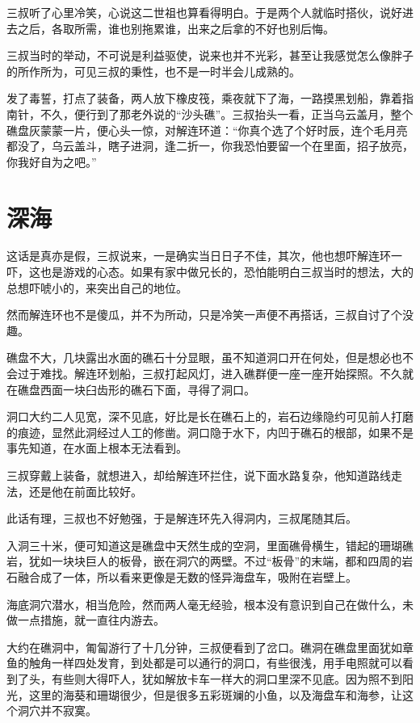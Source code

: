 三叔听了心里冷笑，心说这二世祖也算看得明白。于是两个人就临时搭伙，说好进去之后，各取所需，谁也别拖累谁，出来之后拿的不好也别后悔。

三叔当时的举动，不可说是利益驱使，说来也并不光彩，甚至让我感觉怎么像胖子的所作所为，可见三叔的秉性，也不是一时半会儿成熟的。

发了毒誓，打点了装备，两人放下橡皮筏，乘夜就下了海，一路摸黑划船，靠着指南针，不久，便行到了那老外说的“沙头礁”。三叔抬头一看，正当乌云盖月，整个礁盘灰蒙蒙一片，便心头一惊，对解连环道：“你真个选了个好时辰，连个毛月亮都没了，乌云盖斗，瞎子进洞，逢二折一，你我恐怕要留一个在里面，招子放亮，你我好自为之吧。”

\chapter{深海}

这话是真亦是假，三叔说来，一是确实当日日子不佳，其次，他也想吓解连环一吓，这也是游戏的心态。如果有家中做兄长的，恐怕能明白三叔当时的想法，大的总想吓唬小的，来突出自己的地位。

然而解连环也不是傻瓜，并不为所动，只是冷笑一声便不再搭话，三叔自讨了个没趣。

礁盘不大，几块露出水面的礁石十分显眼，虽不知道洞口开在何处，但是想必也不会过于难找。解连环划船，三叔打起风灯，进入礁群便一座一座开始探照。不久就在礁盘西面一块臼齿形的礁石下面，寻得了洞口。

洞口大约二人见宽，深不见底，好比是长在礁石上的，岩石边缘隐约可见前人打磨的痕迹，显然此洞经过人工的修凿。洞口隐于水下，内凹于礁石的根部，如果不是事先知道，在水面上根本无法看到。

三叔穿戴上装备，就想进入，却给解连环拦住，说下面水路复杂，他知道路线走法，还是他在前面比较好。

此话有理，三叔也不好勉强，于是解连环先入得洞内，三叔尾随其后。

入洞三十米，便可知道这是礁盘中天然生成的空洞，里面礁骨横生，错起的珊瑚礁岩，犹如一块块巨人的板骨，嵌在洞穴的两壁。不过“板骨”的末端，都和四周的岩石融合成了一体，所以看来更像是无数的怪异海盘车，吸附在岩壁上。

海底洞穴潜水，相当危险，然而两人毫无经验，根本没有意识到自己在做什么，未做一点措施，就一直往内游去。

大约在礁洞中，匍匐游行了十几分钟，三叔便看到了岔口。礁洞在礁盘里面犹如章鱼的触角一样四处发育，到处都是可以通行的洞口，有些很浅，用手电照就可以看到了头，有些则大得吓人，犹如解放卡车一样大的洞口里深不见底。因为照不到阳光，这里的海葵和珊瑚很少，但是很多五彩斑斓的小鱼，以及海盘车和海参，让这个洞穴并不寂寞。

